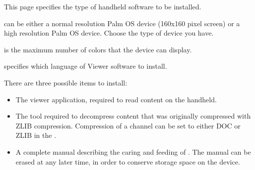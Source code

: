 This page specifies the type of handheld software to be installed.

 can be either a normal resolution 
Palm OS device (160x160 pixel screen) or a high resolution Palm OS device. 
Choose the type of device you have.

 is the maximum number of 
colors that the device can display. 


 specifies which language of 
Viewer software to install.

There are three possible items to install:

\begin{itemize}
  \item {} The viewer application, 
  required to read \brandingapplicationsuitename content on the handheld.

  \item {} The tool required to
  decompress \brandingapplicationsuitename content that was originally compressed with ZLIB
  compression. Compression of a channel can be set to either DOC or ZLIB in 
  the 
  \helpignore{\ref{sec:pd-channel-dialog-output-tab}}
  .

  \item {} A complete manual 
  describing the caring and feeding of \brandingapplicationsuitename. The manual can be erased at 
  any later time, in order to conserve storage space on the device.
\end{itemize}



